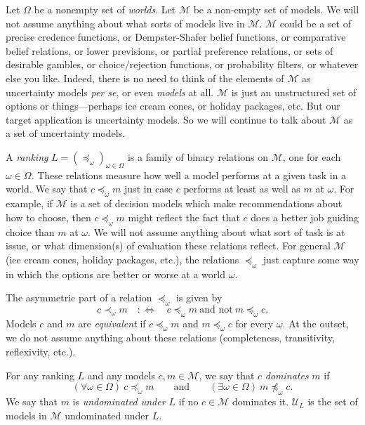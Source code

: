 \documentclass[11pt]{article}
\theoremstyle{definition}
\theoremstyle{remark}
\newcommand{\M}{\mathcal M}
\newcommand{\U}{\mathcal U}
\begin{document}
Let $\Omega$ be a nonempty set of \emph{worlds}. Let $\M$ be a non-empty set of models. We will not assume anything about what sorts of models live in $\M$. $\M$ could be a set of precise credence functions, or Dempster-Shafer belief functions, or comparative belief relations, or lower previsions, or partial preference relations, or sets of desirable gambles, or choice/rejection functions, or probability filters, or whatever else you like. Indeed, there is no need to think of the elements of $\M$ as uncertainty models \textit{per se}, or even \textit{models} at all. $\M$ is just an unstructured set of options or things---perhaps ice cream cones, or holiday packages, etc. But our target application is uncertainty models. So we will continue to talk about $\M$ as a set of uncertainty models.




A \emph{ranking} $L=(\preceq_\omega)_{\omega\in\Omega}$ is a family of binary relations on $\M$, one for each $\omega\in\Omega$. These relations measure how well a model performs at a given task in a world. We say that $c\preceq_\omega m$ just in case $c$ performs at least as well as $m$ at $\omega$. For example, if $\M$ is a set of decision models which make recommendations about how to choose, then $c\preceq_\omega m$ might reflect the fact that $c$ does a better job guiding choice than $m$ at $\omega$. We will not assume anything about what sort of task is at issue, or what dimension(s) of evaluation these relations reflect. For general $\M$ (ice cream cones, holiday packages, etc.), the relations $\preceq_\omega$ just capture some way in which the options are better or worse at a world $\omega$.

The asymmetric part of a relation $\preceq_\omega$ is given by
\[
c\prec_\omega m\quad:\Longleftrightarrow\quad c\preceq_\omega m\ \text{and not}\ m\preceq_\omega c .
\]
Models $c$ and $m$ are \emph{equivalent} if $c\preceq_\omega m$ and $m\preceq_\omega c$ for every $\omega$. At the outset, we do not assume anything about these relations (completeness, transitivity, reflexivity, etc.).

For any ranking $L$ and any models $c,m\in\M$, we say that $c$ \emph{dominates} $m$ if
\[
(\forall\omega\in\Omega)\ c\preceq_\omega m\qquad\text{and}\qquad(\exists\omega\in\Omega)\ m\not\preceq_\omega c .
\]
We say that $m$ is \emph{undominated under $L$} if no $c\in\M$ dominates it. $\U_L$ is the set of models in $\M$ undominated under $L$.
\end{document}

